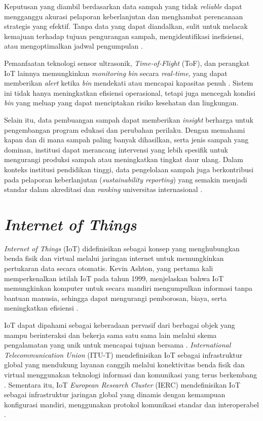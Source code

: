 Keputusan yang diambil berdasarkan data sampah yang tidak \textit{reliable} dapat mengganggu akurasi pelaporan keberlanjutan dan menghambat perencanaan strategis yang efektif. Tanpa data yang dapat diandalkan, sulit untuk melacak kemajuan terhadap tujuan pengurangan sampah, mengidentifikasi inefisiensi, atau mengoptimalkan jadwal pengumpulan \autocite{sensoneo2024}.

Pemanfaatan teknologi sensor ultrasonik, \textit{Time-of-Flight} (ToF), dan perangkat IoT lainnya memungkinkan \textit{monitoring} \textit{bin} secara \textit{real-time}, yang dapat memberikan \textit{alert} ketika \textit{bin} mendekati atau mencapai kapasitas penuh \autocite{pires2025}. Sistem ini tidak hanya meningkatkan efisiensi operasional, tetapi juga mencegah kondisi \textit{bin} yang meluap yang dapat menciptakan risiko kesehatan dan lingkungan.

Selain itu, data pembuangan sampah dapat memberikan \textit{insight} berharga untuk pengembangan program edukasi dan perubahan perilaku. Dengan memahami kapan dan di mana sampah paling banyak dihasilkan, serta jenis sampah yang dominan, institusi dapat merancang intervensi yang lebih spesifik untuk mengurangi produksi sampah atau meningkatkan tingkat daur ulang. Dalam konteks institusi pendidikan tinggi, data pengelolaan sampah juga berkontribusi pada pelaporan keberlanjutan (\textit{sustainability reporting}) yang semakin menjadi standar dalam akreditasi dan \textit{ranking} universitas internasional \autocite{bahcelioglu2020}.

\section{\textit{Internet of Things}}

\textit{Internet of Things} (IoT) didefinisikan sebagai konsep yang menghubungkan benda fisik dan virtual melalui jaringan internet untuk memungkinkan pertukaran data secara otomatis. Kevin Ashton, yang pertama kali memperkenalkan istilah IoT pada tahun 1999, menjelaskan bahwa IoT memungkinkan komputer untuk secara mandiri mengumpulkan informasi tanpa bantuan manusia, sehingga dapat mengurangi pemborosan, biaya, serta meningkatkan efisiensi \autocite{ashton2009}.

IoT dapat dipahami sebagai keberadaan pervasif dari berbagai objek yang mampu berinteraksi dan bekerja sama satu sama lain melalui skema pengalamatan yang unik untuk mencapai tujuan bersama \autocite{atzori2010}. \textit{International Telecommunication Union} (ITU-T) mendefinisikan IoT sebagai infrastruktur global yang mendukung layanan canggih melalui konektivitas benda fisik dan virtual menggunakan teknologi informasi dan komunikasi yang terus berkembang \autocite{itu2012}. Sementara itu, IoT \textit{European Research Cluster} (IERC) mendefinisikan IoT sebagai infrastruktur jaringan global yang dinamis dengan kemampuan konfigurasi mandiri, menggunakan protokol komunikasi standar dan interoperabel \autocite{iotec2014}.

